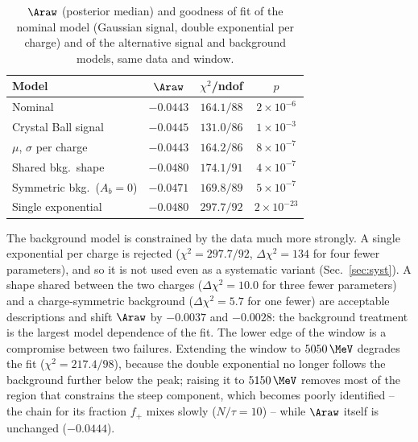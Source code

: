 \begin{table}[!t]
\centering
\begin{tabular}{lccc}
\toprule
Model & $\Araw$ & $\chi^2$/ndof & $p$ \\
\midrule
Nominal & $-0.0443$ & $164.1/88$ & $2\times10^{-6}$ \\
Crystal Ball signal & $-0.0445$ & $131.0/86$ & $1\times10^{-3}$ \\
$\mu$, $\sigma$ per charge & $-0.0443$ & $164.2/86$ & $8\times10^{-7}$ \\
Shared bkg.\ shape & $-0.0480$ & $174.1/91$ & $4\times10^{-7}$ \\
Symmetric bkg.\ ($A_b=0$) & $-0.0471$ & $169.8/89$ & $5\times10^{-7}$ \\
Single exponential & $-0.0480$ & $297.7/92$ & $2\times10^{-23}$ \\
\bottomrule
\end{tabular}
\caption{$\Araw$ (posterior median) and goodness of fit of the nominal model (Gaussian signal, double exponential per charge) and of the alternative signal and background models, same data and window.}
\label{tab:gof}
\end{table}

The background model is constrained by the data much more strongly. A single exponential per charge is rejected ($\chi^2=297.7/92$, $\Delta\chi^2=134$ for four fewer parameters), and so it is not used even as a systematic variant (Sec.~\ref{sec:syst}). A shape shared between the two charges ($\Delta\chi^2=10.0$ for three fewer parameters) and a charge-symmetric background ($\Delta\chi^2=5.7$ for one fewer) are acceptable descriptions and shift $\Araw$ by $-0.0037$ and $-0.0028$: the background treatment is the largest model dependence of the fit. The lower edge of the window is a compromise between two failures. Extending the window to $5050\,\MeV$ degrades the fit ($\chi^2=217.4/98$), because the double exponential no longer follows the background further below the peak; raising it to $5150\,\MeV$ removes most of the region that constrains the steep component, which becomes poorly identified -- the chain for its fraction $f_+$ mixes slowly ($N/\tau=10$) -- while $\Araw$ itself is unchanged ($-0.0444$).

